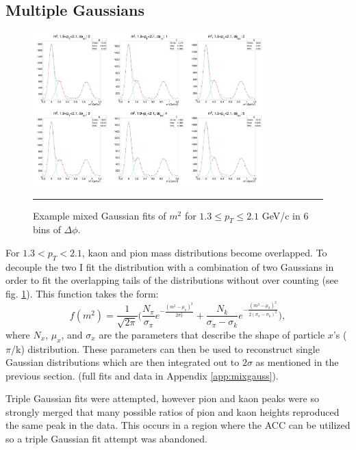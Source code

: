 \subsection{Multiple Gaussians}
\begin{figure}[htbp!]
  \centering
    \includegraphics[width=0.8\textwidth]{lowptfits/yieldvsdphi_tof1_cent0_ch1_pT-19-21.jpg}
    \rule{35em}{0.5pt}
  \caption[Example mixed Gaussian fits of $m^2$ for $1.3 \leq p_T\leq 2.1$ GeV/c in 6 bins of $\Delta \phi$.]{Example mixed Gaussian fits of $m^2$ for $1.3 \leq p_T\leq 2.1$ GeV/c in 6 bins of $\Delta \phi$.}
  \label{fig:mixgausm2}
\end{figure}
For $1.3<p_T<2.1$, kaon and pion mass distributions become overlapped. To decouple the two I fit the distribution with a combination of two Gaussians in order to fit the overlapping tails of the distributions without over counting (see fig. \ref{fig:mixgausm2}). This function takes the form:
\begin{equation}
f(m^2) = \frac{1}{\sqrt{2\pi}} \bigg( \frac{N_{\pi}}{\sigma_{\pi}} e^{-\frac{(m^2-\mu_{\pi})^2}{2\sigma_{\pi}^{2}}} + \frac{N_{k}}{\sigma_{\pi}-\sigma_{k}} e^{-\frac{(m^2-\mu_{k})^2}{2(\sigma_{\pi} - \sigma_{k})^{2}}} \bigg),
\end{equation}
where $N_{x}$, $\mu_x$, and $\sigma_x$ are the parameters that describe the shape of particle $x$'s ($\pi$/k) distribution. These parameters can then be used to reconstruct single Gaussian distributions which are then integrated out to $2\sigma$ as mentioned in the previous section.
(full fits and data in Appendix \ref{app:mixgauss}).

Triple Gaussian fits were attempted, however pion and kaon peaks were so strongly merged that many possible ratios of pion and kaon heights reproduced the same peak in the data. This occurs in a region where the ACC can be utilized so a triple Gaussian fit attempt was abandoned.

